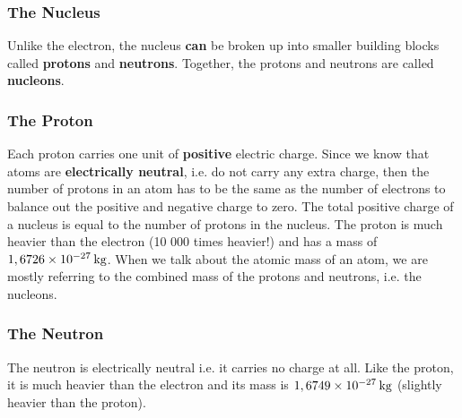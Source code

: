             \subsubsection{ The Nucleus}
            \nopagebreak
        \label{m38745*id255305}Unlike the electron, the nucleus \textbf{can} be broken up into smaller building
blocks called \textbf{protons} and \textbf{neutrons}. Together, the protons and
neutrons are called \textbf{nucleons}.\par 
        \label{m38745*uid12}
            \subsubsection{ The Proton}
            \nopagebreak
          \label{m38745*id255338}Each proton carries one unit of \textbf{positive} electric charge.
Since we know that atoms are
\textbf{electrically neutral}, i.e. do not carry any extra charge, then the number
of protons in an atom has to be the same as the number of electrons to balance
out the positive and negative charge to zero. The total positive charge of a
nucleus is equal to the number of protons in the nucleus. The proton is much heavier
than the electron (10 000 times heavier!) and has a mass of $1,6726\ensuremath{\times}{10}^{-27}\phantom{\rule{2pt}{0ex}}\mathrm{kg}$. When we talk about the atomic mass of an atom, we are mostly referring to the combined mass of the protons and neutrons, i.e. the nucleons.\par 
        \label{m38745*uid13}
            \subsubsection{ The Neutron}
            \nopagebreak
          \label{m38745*id254468}The neutron is electrically neutral i.e. it carries no charge at all.
Like the proton, it is much heavier than the electron and its mass is $1,6749\ensuremath{\times}{10}^{-27}\phantom{\rule{2pt}{0ex}}\mathrm{kg}$ (slightly heavier than the proton).\par 
\label{m38745*notfhsst!!!underscore!!!id214}
	

